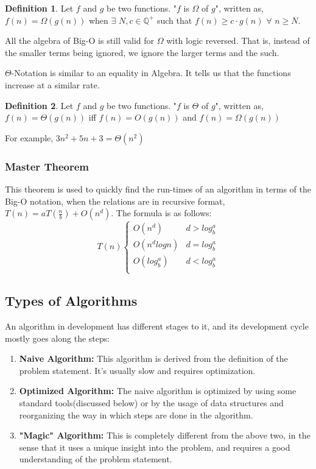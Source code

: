 \documentclass{article}
\theoremstyle{definition}
\newtheorem*{definition}{Definition}
\theoremstyle{example}
\begin{document}
\theoremstyle{definition}
\begin{definition}{}
    Let $f$ and $g$ be two functions. "$f$ is $\Omega$ of $g$", written as, $f(n) = \Omega(g(n))$ when $\exists$ $N, c \in \mathbb{Q}^+$ such that $f(n) \geq c\cdot g(n)$ $\forall$ $n\geq N$.
\end{definition}
\vspace{4mm}
All the algebra of Big-O is still valid for $\Omega$ with logic reversed. That is, instead of the smaller terms being ignored, we ignore the larger terms and the such.\par
\vspace{5mm}
$\Theta$-Notation is similar to an equality in Algebra. It tells us that the functions increase at a similar rate.
\theoremstyle{definition}
\begin{definition}{}
    Let $f$ and $g$ be two functions. "$f$ is $\Theta$ of $g$", written as, $f(n) = \Theta(g(n))$ iff $f(n) = O(g(n))$ and $f(n) = \Omega(g(n))$
\end{definition}
For example, $3n^2+5n+3 = \Theta(n^2)$

\subsubsection{\Large Master Theorem}
\hspace{4mm} This theorem is used to quickly find the run-times of an algorithm in terms of the Big-O notation, when the relations are in recursive format, \(T(n) = aT(\frac{n}{b}) + O(n^d)\). The formula is as follows:
\[   T(n)\left\{
\begin{array}{ll}
      O(n^d) & d > log_b^a \\
      O(n^dlogn) & d = log_b^a \\
      O(log_b^a) & d < log_b^a \\
\end{array} 
\right. \]

\subsection{\Large Types of Algorithms}
\hspace{5mm} An algorithm in development has different stages to it, and its development cycle mostly goes along the steps:

\begin{enumerate}
    \item \textbf{Naive Algorithm:} This algorithm is derived from the definition of the problem statement. It's usually slow and requires optimization.
    \item \textbf{Optimized Algorithm:} The naive algorithm is optimized by using some standard tools(discussed below) or by the usage of data structures and reorganizing the way in which steps are done in the algorithm.
    \item \textbf{"Magic" Algorithm:} This is completely different from the above two, in the sense that it uses a unique insight into the problem, and requires a good understanding of the problem statement.
\end{enumerate}
\end{document}
